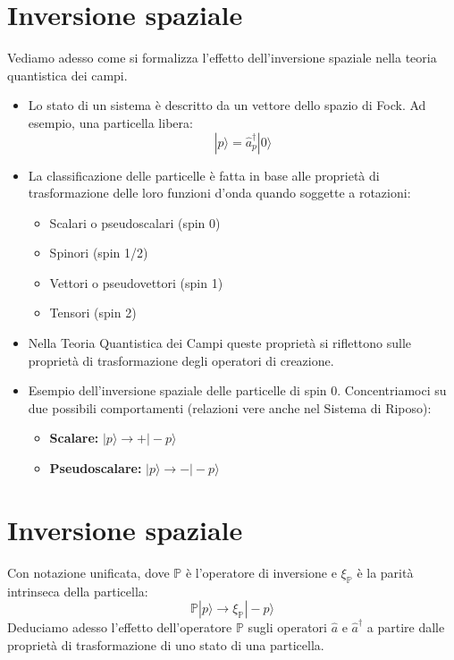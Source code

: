 \section{Inversione spaziale}
Vediamo adesso come si formalizza l'effetto dell'inversione spaziale nella teoria quantistica dei campi.
\begin{itemize}
	\item Lo stato di un sistema è descritto da un vettore dello spazio di Fock. Ad esempio, una particella libera:
	\[
	|p\rangle = \hat{a}_p^\dagger |0\rangle
	\]
	\item La classificazione delle particelle è fatta in base alle proprietà di trasformazione delle loro funzioni d'onda quando soggette a rotazioni:
	\begin{itemize}
		\item Scalari o pseudoscalari (spin 0)
		\item Spinori (spin 1/2)
		\item Vettori o pseudovettori (spin 1)
		\item Tensori (spin 2)
	\end{itemize}
	\item Nella Teoria Quantistica dei Campi queste proprietà si riflettono sulle proprietà di trasformazione degli operatori di creazione.
	\item Esempio dell'inversione spaziale delle particelle di spin 0. Concentriamoci su due possibili comportamenti (relazioni vere anche nel Sistema di Riposo):
	\begin{itemize}
		\item \textbf{Scalare:} $|p\rangle \rightarrow + |-p\rangle$
		\item \textbf{Pseudoscalare:} $|p\rangle \rightarrow - |-p\rangle$
	\end{itemize}
\end{itemize}
\section{Inversione spaziale}

Con notazione unificata, dove $\mathbb{P}$ è l'operatore di inversione e $\xi_{\mathbb{P}}$ è la parità intrinseca della particella:
\[
\mathbb{P}|p\rangle \rightarrow \xi_{\mathbb{P}} |-p\rangle
\]
Deduciamo adesso l'effetto dell'operatore $\mathbb{P}$ sugli operatori $\hat{a}$ e $\hat{a}^\dagger$ a partire dalle proprietà di trasformazione di uno stato di una particella.

